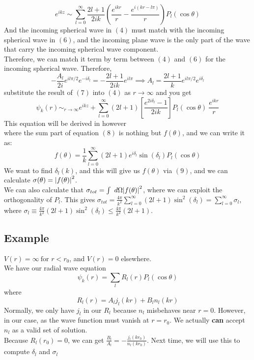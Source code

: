 \documentclass{article}
\begin{document}
\begin{equation}
e^{ikz} \sim \sum_{l=0}^{ \infty} \frac{2l + 1}{2ik} \left(\frac{e^{ikr}}{r} - \frac{e^{i(kr- l  \pi)}}{r} \right) P_l(  \cos  \theta)
\end{equation}
And the incoming spherical wave in $(4)$ must match with the incoming spherical wave in $(6)$, and the incoming plane wave is the only part of the wave that carry the incoming spherical wave component.
\\ 
Therefore, we can match it term by term between $(4)$ and $(6)$ for the incoming spherical wave. Therefore,
\begin{equation}
-\frac{A_l}{2i} e^{il  \pi/2} e^{-i   \delta_l} =-\frac{2 l + 1}{2 i k} e^{i l  \pi} \implies A_l = \frac{2l + 1}{k} e^{i l  \pi / 2} e^{i  \delta_l}
\end{equation}
substitute the result of $(7)$ into $(4)$ as $r \rightarrow  \infty$ and you get 
\begin{equation}
  \psi_k(r) \sim_{r \rightarrow  \infty} e^{ikz} + \sum_{l = 0}^{ \infty}(2l+1) \left[ \frac{e^{2i  \delta_l}-1}{2ik} \right]P_l( \cos  \theta) \ \frac{e^{ikr}}{r} 
\end{equation}
This equation will be derived in however
\\ 
where the sum part of equation $(8)$ is nothing but $f( \theta)$, and we can write it as:
\begin{equation}
f( \theta) = \frac{1}{k} \sum_{l = 0 }^{ \infty} (2l +1) e^{i  \delta_l}  \sin  (\delta_l)P_l  (\cos  \theta)
\end{equation}
We want to find $ \delta_l (k)$, and this will give us $f( \theta)$ via $(9)$, and we can calculate $\sigma ( \theta) = \abs{f ( \theta)} ^2$. 
\\ 
We can also calculate that $\sigma_{tot} = \int \ d\Omega \abs{f( \theta)} ^2$, where we can exploit the orthogonality of $P_l$. This gives $\sigma_{tot} = \frac{4  \pi }{k^2} \sum_{l = 0 }^{ \infty} (2 l + 1)  \sin^2 ( \delta_l) = \sum_{l = 0 }^{ \infty} \sigma_l$, where $\sigma_l \equiv \frac{4  \pi }{k^2} (2 l + 1)  \sin^2 ( \delta_l) \leq \frac{4  \pi }{k^2} (2 l + 1)$.

\subsection*{Example}
$V(r) =  \infty \ \text{for } r<r_0$, and $V(r) = 0$ elsewhere. \\ 
We have our radial wave equation 
\begin{equation*}
 \psi_k(r) = \sum_{l} R_l (r) P_l( \cos  \theta)
\end{equation*}
where 
\begin{equation*}
R_l(r) = A_l j_l (kr)+ B_l n_l (kr)
\end{equation*}
Normally, we only have $j_l$ in our $R_l$ because $n_l$ misbehaves near $r=0$. However, in our case, as the wave function must vanish at $r= r_0$. We actually \textbf{can} accept $n_l$ as a valid set of solution.
\\ 
Because $R_l (r_0) = 0$, we can get $\frac{B_l}{A_l} = - \frac{j_l (k r_0)}{n_l (k r_0)} $. Next time, we will use this to compute $ \delta_l$ and $\sigma_l$
\end{document}

